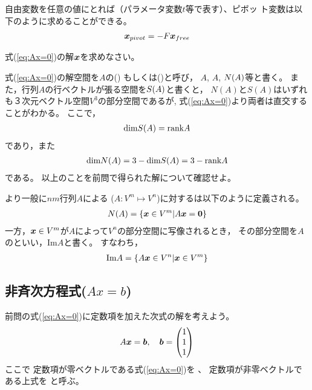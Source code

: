 \documentclass[twocolumn,11pt]{jarticle}
\begin{document}
  自由変数を任意の値にとれば（パラメータ変数$t$等で表す）、ピボッ
  ト変数は以下のように求めることができる。
  \begin{align}
    \boldsymbol{x}_{pivot}=-F\boldsymbol{x}_{free}
  \end{align}

\nquestion 式(\ref{eq:Ax=0})の解$\boldsymbol{x}$を求めなさい。

\nquestion
式(\ref{eq:Ax=0})の解空間を$A$の()
もしくは()と呼び，
$A$, $A$, $\nmindex{N}(A)$等と書く。
また，行列$A$の行ベクトルが張る空間を$\nmindex{S}(A)$と書くと，
$N(A)$と$S(A)$はいずれも３次元ベクトル空間$V^3$の部分空間であるが, 
式(\ref{eq:Ax=0})より両者は直交することがわかる。
ここで，
\begin{align}
\mbox{dim} S(A)=\mbox{rank} A\notag
\end{align}
であり，また
\begin{align}
\mbox{dim} N(A)=3-\mbox{dim} S(A)=3-\mbox{rank} A\notag
\end{align}
である。
以上のことを前問で得られた解について確認せよ。
  
\comment
より一般に$nm$行列$A$による
($A:V^m\mapsto V^n$)に対するは以下のように定義される。
\begin{align}
  N(A)=
\{\boldsymbol{x}\in V^m| A\boldsymbol{x}=\boldsymbol{0}\}\notag
\end{align}
一方，$\boldsymbol{x}\in V^m$が$A$によって$V^n$の部分空間に写像されるとき，
その部分空間を$A$のといい，Im$A$と書く。
すなわち，
\begin{align}
  \mbox{Im}A=\{A\boldsymbol{x}\in V^n| \boldsymbol{x}\in V^m\}\notag
\end{align}%

\subsection{非斉次方程式($Ax=b$)}

前問の式(\ref{eq:Ax=0})に定数項を加えた次式の解を考えよう。
  \begin{align}
    A\vect{x}=\vect{b}\label{eq:Ax=b},\quad
    \vect{b}=
    \begin{pmatrix}
      1\\
      1\\
      1
    \end{pmatrix}%
  \end{align}
ここで
定数項が零ベクトルである式(\ref{eq:Ax=0})を
、
定数項が非零ベクトルである上式を
と呼ぶ。
\end{document}
